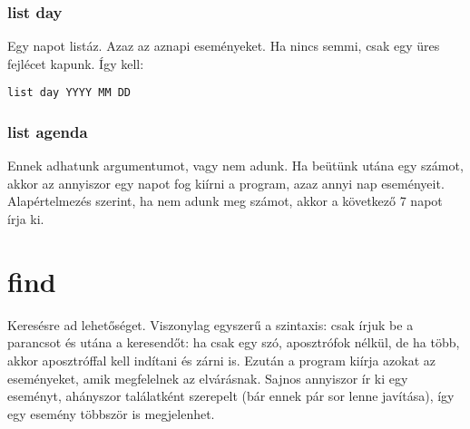 \documentclass[a4paper]{article}
\begin{document}
\subsubsection{list day}

Egy napot listáz. Azaz az aznapi eseményeket. Ha nincs semmi, csak egy üres fejlécet kapunk. Így kell:

\begin{center}
	\texttt{list day YYYY MM DD}
\end{center}

 \subsubsection{list agenda}
 
 Ennek adhatunk argumentumot, vagy nem adunk. Ha beütünk utána egy számot, akkor az annyiszor egy napot fog kiírni a program, azaz annyi nap eseményeit. Alapértelmezés szerint, ha nem adunk meg számot, akkor a következő 7 napot írja ki.
 
 \section{find}
 
 Keresésre ad lehetőséget. Viszonylag egyszerű a szintaxis: csak írjuk be a parancsot és utána a keresendőt: ha csak egy szó, aposztrófok nélkül, de ha több, akkor aposztróffal kell indítani és zárni is. Ezután a program kiírja azokat az eseményeket, amik megfelelnek az elvárásnak. Sajnos annyiszor ír ki egy eseményt, ahányszor találatként szerepelt (bár ennek pár sor lenne javítása), így egy esemény többször is megjelenhet.
	
\end{document}
